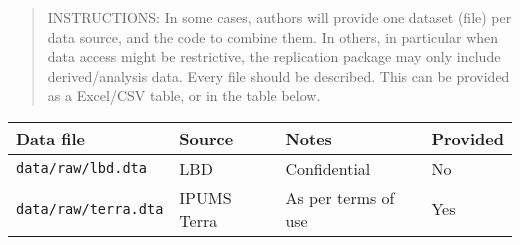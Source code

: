 \documentclass[
]{article}
\begin{document}
\begin{quote}
INSTRUCTIONS: In some cases, authors will provide one dataset (file) per
data source, and the code to combine them. In others, in particular when
data access might be restrictive, the replication package may only
include derived/analysis data. Every file should be described. This can
be provided as a Excel/CSV table, or in the table below.
\end{quote}

\begin{longtable}[]{@{}llll@{}}
\toprule
\begin{minipage}[b]{0.26\columnwidth}\raggedright
Data file\strut
\end{minipage} & \begin{minipage}[b]{0.19\columnwidth}\raggedright
Source\strut
\end{minipage} & \begin{minipage}[b]{0.23\columnwidth}\raggedright
Notes\strut
\end{minipage} & \begin{minipage}[b]{0.21\columnwidth}\raggedright
Provided\strut
\end{minipage}\tabularnewline
\midrule
\endhead
\begin{minipage}[t]{0.26\columnwidth}\raggedright
\texttt{data/raw/lbd.dta}\strut
\end{minipage} & \begin{minipage}[t]{0.19\columnwidth}\raggedright
LBD\strut
\end{minipage} & \begin{minipage}[t]{0.23\columnwidth}\raggedright
Confidential\strut
\end{minipage} & \begin{minipage}[t]{0.21\columnwidth}\raggedright
No\strut
\end{minipage}\tabularnewline
\begin{minipage}[t]{0.26\columnwidth}\raggedright
\texttt{data/raw/terra.dta}\strut
\end{minipage} & \begin{minipage}[t]{0.19\columnwidth}\raggedright
IPUMS Terra\strut
\end{minipage} & \begin{minipage}[t]{0.23\columnwidth}\raggedright
As per terms of use\strut
\end{minipage} & \begin{minipage}[t]{0.21\columnwidth}\raggedright
Yes\strut
\end{minipage}\tabularnewline

\end{longtable}
\end{document}

